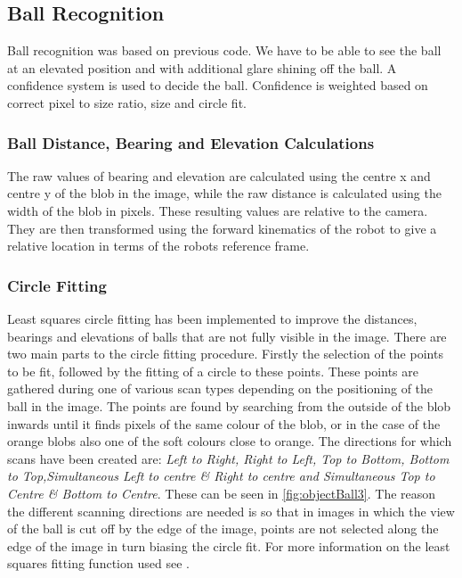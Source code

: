 \subsection{Ball Recognition}

Ball recognition was based on previous code. We have to be able to see the ball at an elevated position and with additional glare shining off the ball. A confidence system is used to decide the ball. Confidence is weighted based on correct pixel to size ratio, size and circle fit.

\subsubsection{Ball Distance, Bearing and Elevation Calculations}
The raw values of bearing and elevation are calculated using the centre x and centre y of the blob in the image, while the raw
distance is calculated using the width of the blob in pixels. These resulting values are relative to the camera. They are then transformed using the forward kinematics of the robot to give a relative location in terms of the robots reference frame.

\subsubsection{Circle Fitting}

Least squares circle fitting has been implemented to improve the distances, bearings and elevations of balls that are not fully
visible in the image. There are two main parts to the circle fitting procedure. Firstly the selection of the points to be fit, followed by the fitting of a circle to these points. These points are gathered during one of various scan types depending on the positioning of the ball in the image. The points are found by searching from the outside of the blob inwards until it finds pixels of the same colour of the blob, or in the case of the orange blobs also one of the soft colours close to orange. The directions for which scans have been created are: \emph{Left to Right, Right to Left, Top to Bottom, Bottom to Top,Simultaneous Left to centre \& Right to centre and Simultaneous Top to Centre \& Bottom to Centre}. These can be seen in \autoref{fig:objectBall3}. The reason the different scanning directions are needed is so that in images in which the view of the ball is cut off by the edge of the image, points are not selected along the edge of the image in turn biasing the circle fit. For more information on the least squares fitting function used see \cite{Seysener2003,SeysenerMurchMiddleton2004}.

